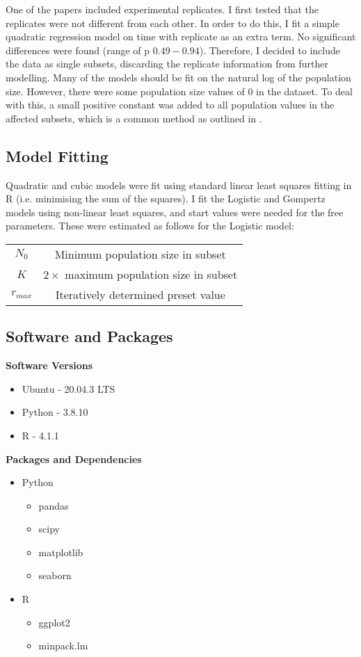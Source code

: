 \documentclass[11pt,a4wide,titlepage]{article}
\begin{document}
One of the papers \citep{bernhardtMetabolicTheoryTemperatureSize2018} included experimental replicates. I first tested that the replicates were not different from each other. In order to do this, I fit a simple quadratic regression model on time with replicate as an extra term. No significant differences were found (range of p $0.49 - 0.94$). Therefore, I decided to include the data as single subsets, discarding the replicate information from further modelling. Many of the models should be fit on the natural log of the population size. However, there were some population size values of 0 in the dataset. To deal with this, a small positive constant was added to all population values in the affected subsets, which is a common method as outlined in \cite{bellegoDealingLogsZeros2021}.

\subsection*{Model Fitting}
Quadratic and cubic models were fit using standard linear least squares fitting in R (i.e. minimising the sum of the squares). I fit the Logistic and Gompertz models using non-linear least squares, and start values were needed for the free parameters. These were estimated as follows for the Logistic model:
\begin{center}
\begin{tabular}{cc}
	$N_0$ & Minimum population size in subset\\
	$K$ & $2\times$ maximum population size in subset\\
	$r_{max}$ & Iteratively determined preset value\\
\end{tabular}
\end{center}

\subsection*{Software and Packages}
\textbf{Software Versions}
\begin{itemize}
    \item Ubuntu - 20.04.3 LTS
    \item Python - 3.8.10
    \item R - 4.1.1
\end{itemize}


\noindent
\textbf{Packages and Dependencies}
\begin{itemize}
    \item Python
    \begin{itemize}
        \item pandas
        \item scipy
        \item matplotlib
        \item seaborn
    \end{itemize}
    \item R
    \begin{itemize}
        \item ggplot2
        \item minpack.lm
    \end{itemize}
\end{itemize}
\end{document}
